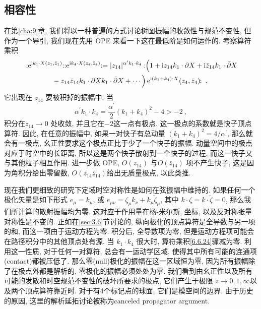 \subsection*{相容性}
在第\ref{cha:9}章, 我们将以一种普遍的方式讨论树图振幅的收敛性与规范不变性, 但作为一个导引, 我们现在先用 OPE 来看一下这在最低阶是如何运作的. 考察算符乘积
\begin{align}
	&: \mathrel{\mathrm{e}^{\mathrm{i} k_{1} \cdot X(z_{1}, \bar{z}_{1})}}: 
	: \mathrel{\mathrm{e}^{\mathrm{i} k_{4} \cdot X(z_{4}, \bar{z}_{4})}}: = 
	|z_{14}|^{\alpha^{\prime} k_{1} \cdot k_{4}}:\!\!
	\Bigl(1+ \mathrm{i} z_{14} k_{1} \cdot \partial X + \mathrm{i} \bar{z}_{14} k_{1} \cdot \bar{\partial} X \nonumber \\
	&\qquad \qquad -z_{14} \bar{z}_{14} k_{1} \cdot \partial X k_{1} \cdot \bar{\partial} X+\cdots \Bigr) 
	\,\mathrm{e}^{\mathrm{i}(k_{1}+k_{4}) \cdot X}(z_{4}, \bar{z}_{4})\!\!: \:. \label{6.6.24}
\end{align}
它出现在 $z_{14}$ 要被积掉的振幅中. 当 
\begin{equation}
	\alpha^{\prime} k_{1} \cdot k_{4}=\frac{\alpha^{\prime}}{2}(k_{1}+k_{4})^{2}-4>-2 \:, \label{6.6.25}
\end{equation}
积分在$z_{14} \rightarrow 0$ 处收敛, 并且它在${-}2$这一点有极点. 这一极点的系数就是快子顶点算符. 因此, 在任意的振幅中, 
如果一对快子有总动量 $(k_{1}+k_{4})^{2}=4 / \alpha^{\prime}$, 那么就会有一极点, 幺正性要求这个极点正比于少了一个快子的振幅. 
动量空间中的极点对应于时空中的长距离, 所以这是两个快子散射到一个快子的过程, 而这一快子又与其他粒子相互作用. 进一步做 OPE, 
$O(z_{14})$ 与$O(\bar{z}_{14})$ 项不产生快子, 这是因为角积分给出零留数, $O(z_{14} \bar{z}_{14})$给出无质量极点, 以此类推.

现在我们更细致的研究下定域时空对称性是如何在弦振幅中维持的. 如果任何一个极化矢量是如下形式 $e_{\mu}=k_{\mu}$, 
或 $e_{\mu \nu}=\zeta_{\mu} k_{\nu}+k_{\mu} \tilde{\zeta}_{\mu}$, 其中 $k \cdot \zeta=k \cdot \tilde{\zeta}=0 $, 
那么我们所计算的散射振幅均为零. 这对应于作用量在杨-米尔斯, 坐标, 以及反对称张量对称性是不变的. 正如在\ref{sec:3.6}节讨论的, 
纵向极化的顶点算符是全导数与另一项的和, 而这一项由于运动方程为零. 积分后, 全导数项为零, 但是运动方程项可能会在路径积分中的其他顶点处有源. 
当 $k_{1} \cdot k_{4}$ 很大时, 算符乘积\eqref{6.6.24}骤减为零. 利用这一性质, 对于任何一对算符, 总会有一运动学区域, 
使得其中所有可能的连通项(contact)都被压低了. 那么零(null)极化的振幅在这一区域恒为零, 因为所有振幅除了在极点外都是解析的, 零极化的振幅必须处处为零. 
我们看到由幺正性以及所有可能的发散和时空规范不变性的破坏所要求的极点,  它们产生于极限 $z \rightarrow 0,1, \infty$以及两个顶点算符靠近时. 
对于有4个标记点的球面, 它们是模空间的边界. 由于历史的原因, 这里的解析延拓讨论被称为canceled propagator argument.

